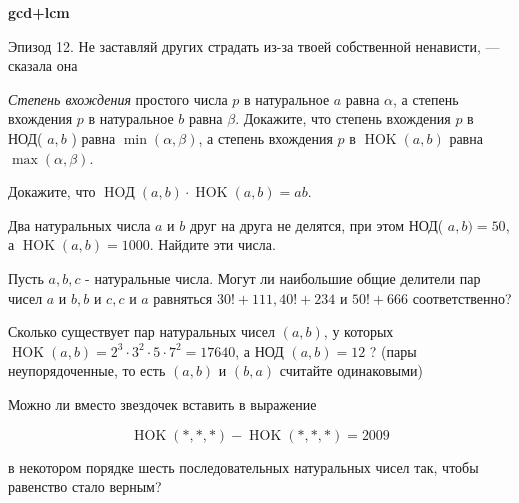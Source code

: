 \centerline{\bf \Huge gcd+lcm}

\begin{flushright}
        \scriptsize{Эпизод 12. Не заставляй других страдать из-за твоей собственной ненависти, — сказала она}
\end{flushright}


\textit{Степень вхождения} простого числа $p$ в натуральное $a$ равна $\alpha$, а степень вхождения $p$ в натуральное $b$ равна $\beta$. Докажите, что степень вхождения $p$ в НОД( $a, b$ ) равна $\min (\alpha, \beta)$, а степень вхождения $p$ в $\operatorname{HOK}(a, b)$ равна $\max (\alpha, \beta)$.

Докажите, что $\operatorname{HOД}(a, b) \cdot \operatorname{HOK}(a, b)=a b$.

Два натуральных числа $a$ и $b$ друг на друга не делятся, при этом НОД( $a, b)=50$, а $\operatorname{HOK}(a, b)=1000$. Найдите эти числа.

Пусть $a, b, c$ - натуральные числа. Могут ли наибольшие общие делители пар чисел $a$ и $b, b$ и $c, c$ и $a$ равняться $30!+111,40!+234$ и $50!+666$ соответственно?

Сколько существует пар натуральных чисел $(a, b)$, у которых $\operatorname{HOK}(a, b)=2^3 \cdot 3^2 \cdot 5 \cdot 7^2=17640$, а НОД $(a, b)=12$ ? (пары неупорядоченные, то есть $(a, b)$ и $(b, a)$ считайте одинаковыми)

Можно ли вместо звездочек вставить в выражение

$$
\operatorname{HOK}(*, *, *)-\operatorname{HOK}(*, *, *)=2009
$$


в некотором порядке шесть последовательных натуральных чисел так, чтобы равенство стало верным?